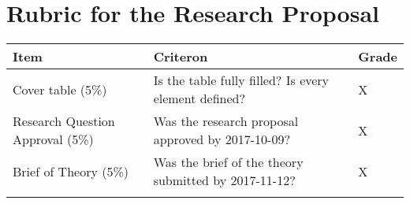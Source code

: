 \documentclass[11pt,]{article}
\theoremstyle{definition}
\theoremstyle{definition}
\theoremstyle{remark}
\begin{document}
\section{Rubric for the Research
Proposal}\label{rubric-for-the-research-proposal}

\begin{longtable}[]{@{}lll@{}}
\toprule
\begin{minipage}[b]{0.12\columnwidth}\raggedright\strut
Item\strut
\end{minipage} & \begin{minipage}[b]{0.76\columnwidth}\raggedright\strut
Criteron\strut
\end{minipage} & \begin{minipage}[b]{0.03\columnwidth}\raggedright\strut
Grade\strut
\end{minipage}\tabularnewline
\midrule
\endhead
\begin{minipage}[t]{0.12\columnwidth}\raggedright\strut
Cover table (5\%)\strut
\end{minipage} & \begin{minipage}[t]{0.76\columnwidth}\raggedright\strut
Is the table fully filled? Is every element defined?\strut
\end{minipage} & \begin{minipage}[t]{0.03\columnwidth}\raggedright\strut
X\strut
\end{minipage}\tabularnewline
\begin{minipage}[t]{0.12\columnwidth}\raggedright\strut
Research Question Approval (5\%)\strut
\end{minipage} & \begin{minipage}[t]{0.76\columnwidth}\raggedright\strut
Was the research proposal approved by 2017-10-09?\strut
\end{minipage} & \begin{minipage}[t]{0.03\columnwidth}\raggedright\strut
X\strut
\end{minipage}\tabularnewline
\begin{minipage}[t]{0.12\columnwidth}\raggedright\strut
Brief of Theory (5\%)\strut
\end{minipage} & \begin{minipage}[t]{0.76\columnwidth}\raggedright\strut
Was the brief of the theory submitted by 2017-11-12?\strut
\end{minipage} & \begin{minipage}[t]{0.03\columnwidth}\raggedright\strut
X\strut
\end{minipage}\tabularnewline
\begin{minipage}[t]{0.12\columnwidth}\raggedright\strut

\end{minipage}
\end{longtable}
\end{document}
